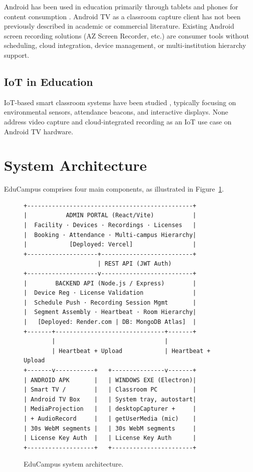 \documentclass[12pt,a4paper]{article}
\begin{document}
Android has been used in education primarily through tablets and phones for content consumption \cite{androidEdu}. Android TV as a classroom capture client has not been previously described in academic or commercial literature. Existing Android screen recording solutions (AZ Screen Recorder, etc.) are consumer tools without scheduling, cloud integration, device management, or multi-institution hierarchy support.

\subsection{IoT in Education}

IoT-based smart classroom systems have been studied \cite{iotClassroom}, typically focusing on environmental sensors, attendance beacons, and interactive displays. None address video capture and cloud-integrated recording as an IoT use case on Android TV hardware.

\section{System Architecture}

EduCampus comprises four main components, as illustrated in Figure~\ref{fig:arch}.

\begin{figure}[H]
\centering
\begin{lstlisting}
+-----------------------------------------------+
|           ADMIN PORTAL (React/Vite)           |
|  Facility · Devices · Recordings · Licenses   |
|  Booking · Attendance · Multi-campus Hierarchy|
|            [Deployed: Vercel]                 |
+--------------------+--------------------------+
                     | REST API (JWT Auth)
+--------------------v--------------------------+
|        BACKEND API (Node.js / Express)        |
|  Device Reg · License Validation              |
|  Schedule Push · Recording Session Mgmt       |
|  Segment Assembly · Heartbeat · Room Hierarchy|
|   [Deployed: Render.com | DB: MongoDB Atlas]  |
+-------+-------------------------------+-------+
        |                               |
        | Heartbeat + Upload            | Heartbeat + Upload
+-------v-----------+   +---------------v-------+
| ANDROID APK       |   | WINDOWS EXE (Electron)|
| Smart TV /        |   | Classroom PC          |
| Android TV Box    |   | System tray, autostart|
| MediaProjection   |   | desktopCapturer +     |
| + AudioRecord     |   | getUserMedia (mic)    |
| 30s WebM segments |   | 30s WebM segments     |
| License Key Auth  |   | License Key Auth      |
+-------------------+   +-----------------------+
\end{lstlisting}
\caption{EduCampus system architecture.}
\label{fig:arch}
\end{figure}
\end{document}
